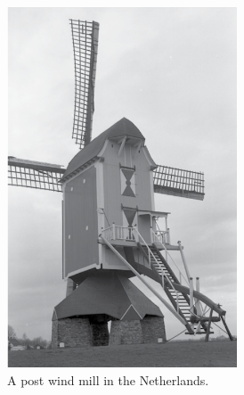 \begin{figure}[h!]
    \centering
    \captionsetup{justification=centering}
    \begin{subfigure}[b]{0.45\textwidth}
    \centering
    \captionsetup{justification=centering}
        \includegraphics[width=0.75\textwidth]{ch1_introduction/images/postwindmill.png}
        \caption{A post wind mill in the Netherlands.}
    \end{subfigure}
    ~ %
    \begin{subfigure}[b]{0.45\textwidth}
    \captionsetup{justification=centering}

\end{subfigure}
\end{figure}
